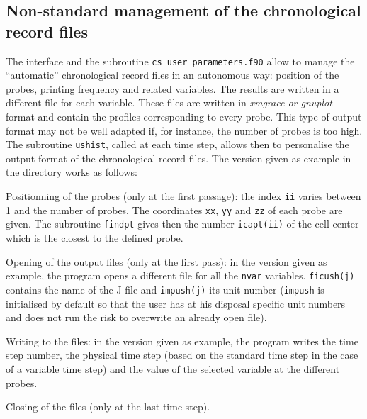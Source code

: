 {{{%
\subsection{Non-standard management of the chronological record files}
\label{prg_ushist}

The interface and the subroutine \texttt{cs\_user\_parameters.f90} allow to manage the
``automatic'' chronological record files in an autonomous way:
position of the probes, printing frequency and related variables. The
results are written in a different file for each variable. These files
are written in {\em xmgrace or {\em gnuplot}} format and contain the profiles corresponding to
every probe. This type of output format may not be well adapted if, for
instance, the number of probes is too high. The subroutine
\texttt{ushist}, called at each time step, allows then to personalise the output format of the
chronological record files. The version given as example in the
directory works as follows:

\begin{list}{-}{}
\item Positionning of the probes (only at the first passage): the index
      \texttt{ii} varies between 1 and the number of probes. The coordinates
      \texttt{xx}, \texttt{yy} and \texttt{zz} of each probe are given.
      The subroutine \texttt{findpt}
      gives then the number \texttt{icapt(ii)} of the cell center
      which is the closest to the defined probe.

\item Opening of the output files (only at the first pass): in the
      version given as example, the program opens a different file for
      all the \texttt{nvar} variables. \texttt{ficush(j)} contains the name of the
      J\raisebox{1ex}{\small th} file and \texttt{impush(j)} its unit number
      (\texttt{impush} is initialised by default so that the user has at his
      disposal specific unit numbers and does not run the risk to overwrite an
      already open file).

\item Writing to the files: in the version given as example, the program
      writes the time step number, the physical time step (based on the
      standard time step in the case of a variable time step) and the
      value of the selected variable at the different probes.

\item Closing of the files (only at the last time step).


\end{list}}}}

